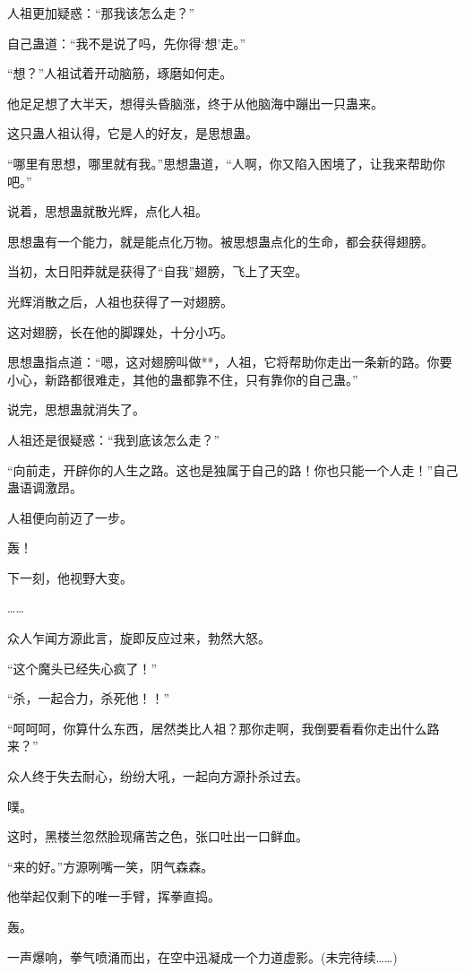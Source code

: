 \begin{this_body}
人祖更加疑惑：“那我该怎么走？”

自己蛊道：“我不是说了吗，先你得‘想’走。”

“想？”人祖试着开动脑筋，琢磨如何走。

他足足想了大半天，想得头昏脑涨，终于从他脑海中蹦出一只蛊来。

这只蛊人祖认得，它是人的好友，是思想蛊。

“哪里有思想，哪里就有我。”思想蛊道，“人啊，你又陷入困境了，让我来帮助你吧。”

说着，思想蛊就散光辉，点化人祖。

思想蛊有一个能力，就是能点化万物。被思想蛊点化的生命，都会获得翅膀。

当初，太日阳莽就是获得了“自我”翅膀，飞上了天空。

光辉消散之后，人祖也获得了一对翅膀。

这对翅膀，长在他的脚踝处，十分小巧。

思想蛊指点道：“嗯，这对翅膀叫做**，人祖，它将帮助你走出一条新的路。你要小心，新路都很难走，其他的蛊都靠不住，只有靠你的自己蛊。”

说完，思想蛊就消失了。

人祖还是很疑惑：“我到底该怎么走？”

“向前走，开辟你的人生之路。这也是独属于自己的路！你也只能一个人走！”自己蛊语调激昂。

人祖便向前迈了一步。

轰！

下一刻，他视野大变。

……

众人乍闻方源此言，旋即反应过来，勃然大怒。

“这个魔头已经失心疯了！”

“杀，一起合力，杀死他！！”

“呵呵呵，你算什么东西，居然类比人祖？那你走啊，我倒要看看你走出什么路来？”

众人终于失去耐心，纷纷大吼，一起向方源扑杀过去。

噗。

这时，黑楼兰忽然脸现痛苦之色，张口吐出一口鲜血。

“来的好。”方源咧嘴一笑，阴气森森。

他举起仅剩下的唯一手臂，挥拳直捣。

轰。

一声爆响，拳气喷涌而出，在空中迅凝成一个力道虚影。(未完待续……)

\end{this_body}

